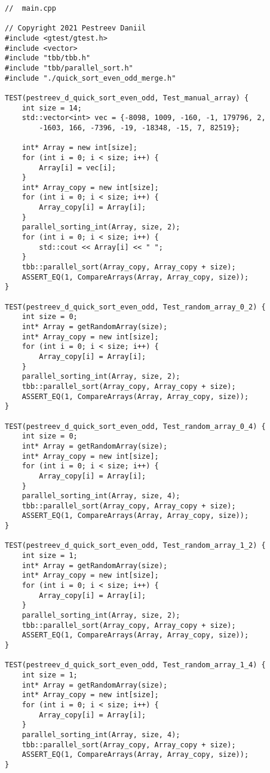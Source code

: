 \documentclass{report}
\begin{document}
\begin{lstlisting}
//  main.cpp

// Copyright 2021 Pestreev Daniil
#include <gtest/gtest.h>
#include <vector>
#include "tbb/tbb.h"
#include "tbb/parallel_sort.h"
#include "./quick_sort_even_odd_merge.h"

TEST(pestreev_d_quick_sort_even_odd, Test_manual_array) {
    int size = 14;
    std::vector<int> vec = {-8098, 1009, -160, -1, 179796, 2,
        -1603, 166, -7396, -19, -18348, -15, 7, 82519};

    int* Array = new int[size];
    for (int i = 0; i < size; i++) {
        Array[i] = vec[i];
    }
    int* Array_copy = new int[size];
    for (int i = 0; i < size; i++) {
        Array_copy[i] = Array[i];
    }
    parallel_sorting_int(Array, size, 2);
    for (int i = 0; i < size; i++) {
        std::cout << Array[i] << " ";
    }
    tbb::parallel_sort(Array_copy, Array_copy + size);
    ASSERT_EQ(1, CompareArrays(Array, Array_copy, size));
}

TEST(pestreev_d_quick_sort_even_odd, Test_random_array_0_2) {
    int size = 0;
    int* Array = getRandomArray(size);
    int* Array_copy = new int[size];
    for (int i = 0; i < size; i++) {
        Array_copy[i] = Array[i];
    }
    parallel_sorting_int(Array, size, 2);
    tbb::parallel_sort(Array_copy, Array_copy + size);
    ASSERT_EQ(1, CompareArrays(Array, Array_copy, size));
}

TEST(pestreev_d_quick_sort_even_odd, Test_random_array_0_4) {
    int size = 0;
    int* Array = getRandomArray(size);
    int* Array_copy = new int[size];
    for (int i = 0; i < size; i++) {
        Array_copy[i] = Array[i];
    }
    parallel_sorting_int(Array, size, 4);
    tbb::parallel_sort(Array_copy, Array_copy + size);
    ASSERT_EQ(1, CompareArrays(Array, Array_copy, size));
}

TEST(pestreev_d_quick_sort_even_odd, Test_random_array_1_2) {
    int size = 1;
    int* Array = getRandomArray(size);
    int* Array_copy = new int[size];
    for (int i = 0; i < size; i++) {
        Array_copy[i] = Array[i];
    }
    parallel_sorting_int(Array, size, 2);
    tbb::parallel_sort(Array_copy, Array_copy + size);
    ASSERT_EQ(1, CompareArrays(Array, Array_copy, size));
}

TEST(pestreev_d_quick_sort_even_odd, Test_random_array_1_4) {
    int size = 1;
    int* Array = getRandomArray(size);
    int* Array_copy = new int[size];
    for (int i = 0; i < size; i++) {
        Array_copy[i] = Array[i];
    }
    parallel_sorting_int(Array, size, 4);
    tbb::parallel_sort(Array_copy, Array_copy + size);
    ASSERT_EQ(1, CompareArrays(Array, Array_copy, size));
}


\end{lstlisting}
\end{document}
